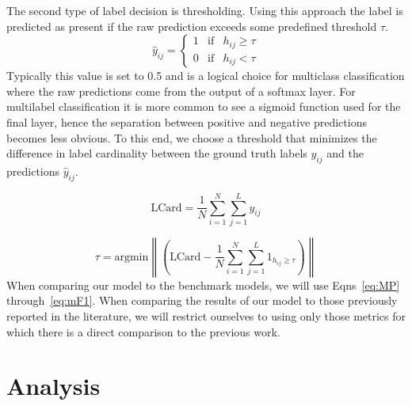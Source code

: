 \documentclass[12pt,journal,compsoc]{IEEEtran}
\begin{document}
The second type of label decision is thresholding. Using this approach the label is predicted as present if the raw prediction exceeds some predefined threshold $\tau$. 
\begin{equation}
\hat{y}_{ij} = \left\{
    \begin{array}{lll}
        1 & \mathrm{if} & h_{ij} \geq \tau \\
        0 & \mathrm{if} & h_{ij} < \tau
    \end{array}
\right.
\end{equation}
Typically this value is set to 0.5 and is a logical choice for multiclass classification where the raw predictions come from the output of a softmax layer.  For multilabel classification it is more common to see a sigmoid function used for the final layer, hence the separation between positive and negative predictions becomes less obvious. To this end, we choose a threshold that minimizes the difference in label cardinality between the ground truth labels $y_{ij}$ and the predictions $\hat{y}_{ij}$.~\cite{Read:2011}

\begin{equation}
\mathrm{LCard} = \frac{1}{N}\sum_{i=1}^{N}\sum_{j=1}^{L}y_{ij}
\label{eq:lcard}
\end{equation}

\begin{equation}
\tau = \mathrm{argmin}\left\|\left(\mathrm{LCard}-\frac{1}{N}\sum_{i=1}^{N}\sum_{j=1}^{L}1_{h_{ij} \geq \tau}\right)\right\|
\label{eq:tau}
\end{equation}
When comparing our model to the benchmark models, we will use Eqns~\ref{eq:MP} through~\ref{eq:mF1}. When comparing the results of our model to those previously reported in the literature, we will restrict ourselves to using only those metrics for which there is a direct comparison to the previous work.


\section{Analysis} %
\end{document}
